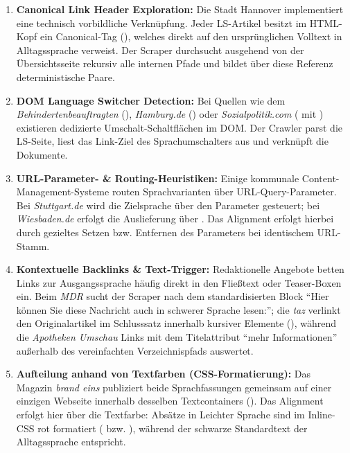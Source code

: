 \begin{enumerate}
    \item \textbf{Canonical Link Header Exploration:} Die Stadt Hannover implementiert eine technisch vorbildliche Verknüpfung. Jeder LS-Artikel besitzt im HTML-Kopf ein Canonical-Tag (), welches direkt auf den ursprünglichen Volltext in Alltagssprache verweist. Der Scraper durchsucht ausgehend von der Übersichtsseite rekursiv alle internen Pfade und bildet über diese Referenz deterministische Paare.
    \item \textbf{DOM Language Switcher Detection:} Bei Quellen wie dem \textit{Behindertenbeauftragten} (), \textit{Hamburg.de} () oder \textit{Sozialpolitik.com} ( mit ) existieren dedizierte Umschalt-Schaltflächen im DOM. Der Crawler parst die LS-Seite, liest das Link-Ziel des Sprachumschalters aus und verknüpft die Dokumente.
    \item \textbf{URL-Parameter- \& Routing-Heuristiken:} Einige kommunale Content-Management-Systeme routen Sprachvarianten über URL-Query-Parameter. Bei \textit{Stuttgart.de} wird die Zielsprache über den Parameter  gesteuert; bei \textit{Wiesbaden.de} erfolgt die Auslieferung über . Das Alignment erfolgt hierbei durch gezieltes Setzen bzw. Entfernen des Parameters bei identischem URL-Stamm.
    \item \textbf{Kontextuelle Backlinks \& Text-Trigger:} Redaktionelle Angebote betten Links zur Ausgangssprache häufig direkt in den Fließtext oder Teaser-Boxen ein. Beim \textit{MDR} sucht der Scraper nach dem standardisierten Block \enquote{Hier können Sie diese Nachricht auch in schwerer Sprache lesen:}; die \textit{taz} verlinkt den Originalartikel im Schlusssatz innerhalb kursiver Elemente (), während die \textit{Apotheken Umschau} Links mit dem Titelattribut \enquote{mehr Informationen} außerhalb des vereinfachten Verzeichnispfads auswertet.
    \item \textbf{Aufteilung anhand von Textfarben (CSS-Formatierung):} Das Magazin \textit{brand eins} publiziert beide Sprachfassungen gemeinsam auf einer einzigen Webseite innerhalb desselben Textcontainers (). Das Alignment erfolgt hier über die Textfarbe: Absätze in Leichter Sprache sind im Inline-CSS rot formatiert ( bzw. ), während der schwarze Standardtext der Alltagssprache entspricht.
\end{enumerate}

